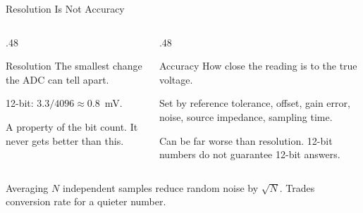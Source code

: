 \documentclass[9pt,aspectratio=169,xcolor=table]{beamer}
\begin{document}
\begin{frame}{Resolution Is Not Accuracy}
    \leavevmode
    \begin{columns}[T]
    \begin{column}{.48\textwidth}
        \begin{block}{Resolution}
            {\small The smallest change the ADC can \alert{tell apart}.}

            \vspace{1mm}
            {\small 12-bit: $3.3/4096 \approx 0.8$~mV.}
        \end{block}

        \vspace{2mm}
        {\small A property of the \alert{bit count}. It never gets
        better than this.}
    \end{column}
    \begin{column}{.48\textwidth}
        \begin{block}{Accuracy}
            {\small How close the reading is to the \alert{true} voltage.}

            \vspace{1mm}
            {\small Set by reference tolerance, offset, gain error,
            noise, source impedance, sampling time.}
        \end{block}

        \vspace{2mm}
        {\small Can be far worse than resolution. 12-bit numbers do
        not guarantee 12-bit answers.}
    \end{column}
    \end{columns}

    \vspace{3mm}
    \begin{block}{Averaging}
        $N$ independent samples reduce random noise by $\sqrt{N}$.
        Trades conversion rate for a quieter number.
    \end{block}
\end{frame}
\end{document}
